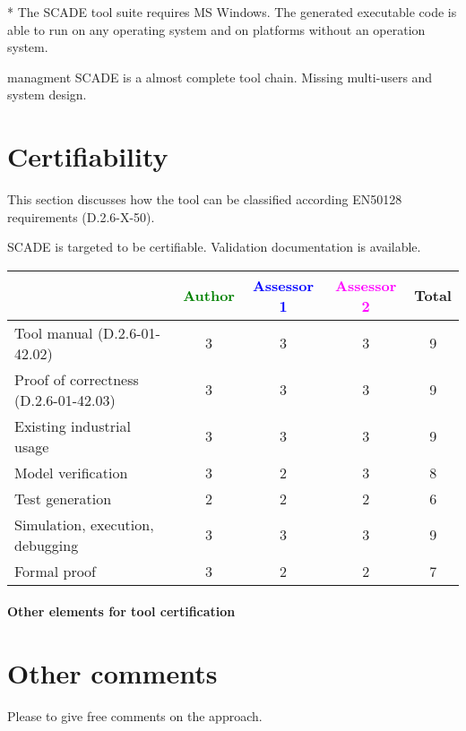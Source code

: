 \begin{author_comment}
* The SCADE tool suite requires MS Windows. The generated executable code is able to run on any operating system and on platforms without an operation system.   
\end{author_comment}

\begin{assessor2}managment
SCADE is a almost complete tool chain. Missing multi-users and system design.
\end{assessor2}
\section{Certifiability}

This section discusses how the tool can be classified according EN50128 requirements (D.2.6-X-50).

\begin{author_comment}
SCADE is targeted to be certifiable. Validation documentation is available.   
\end{author_comment}


\begin{tabular}{|l | c | c | c | c|}
\hline
& \textcolor{green}{Author} & \textcolor{blue}{Assessor 1} & \textcolor{magenta}{Assessor 2} & Total \\
\hline 
Tool manual (D.2.6-01-42.02) & 3 & 3 &3 & 9 \\
\hline
Proof of correctness (D.2.6-01-42.03)   & 3 & 3 &3 & 9 \\
\hline
Existing industrial  usage  & 3 & 3 &3 & 9 \\
\hline
Model verification & 3 & 2 &3 & 8 \\
\hline
Test generation & 2 & 2 &2 & 6 \\
\hline
Simulation, execution, debugging & 3 & 3 &3 & 9 \\
\hline
Formal proof & 3 & 2 &2 & 7 \\
\hline
\end{tabular}

\paragraph{Other elements for tool certification}

\section{Other comments}
Please to  give free comments on the approach.




